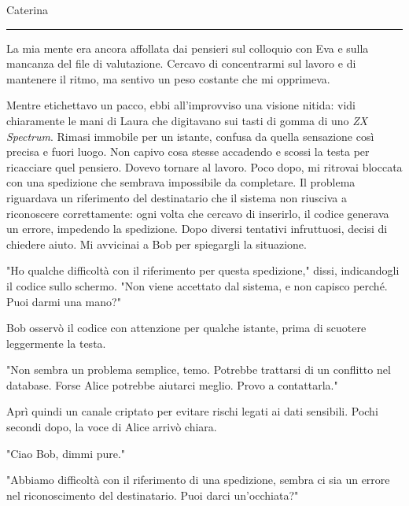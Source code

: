 \vspace{1em}
\begin{center}Caterina\end{center}
\hrule
\vspace{1em}

La mia mente era ancora affollata dai pensieri sul colloquio con Eva e sulla mancanza del file di valutazione. Cercavo di concentrarmi sul lavoro e di mantenere il ritmo, ma sentivo un peso costante che mi opprimeva.

Mentre etichettavo un pacco, ebbi all'improvviso una visione nitida: vidi chiaramente le mani di Laura che digitavano sui tasti di gomma di uno \emph{ZX Spectrum}. Rimasi immobile per un istante, confusa da quella sensazione così precisa e fuori luogo. Non capivo cosa stesse accadendo e scossi la testa per ricacciare quel pensiero. Dovevo tornare al lavoro.
Poco dopo, mi ritrovai bloccata con una spedizione che sembrava impossibile da completare. Il problema riguardava un riferimento del destinatario che il sistema non riusciva a riconoscere correttamente: ogni volta che cercavo di inserirlo, il codice generava un errore, impedendo la spedizione. Dopo diversi tentativi infruttuosi, decisi di chiedere aiuto. Mi avvicinai a Bob per spiegargli la situazione.

\begin{dialogue}
 "Ho qualche difficoltà con il riferimento per questa spedizione," dissi, indicandogli il codice sullo schermo. "Non viene accettato dal sistema, e non capisco perché. Puoi darmi una mano?"
\end{dialogue}

Bob osservò il codice con attenzione per qualche istante, prima di scuotere leggermente la testa.

\begin{dialogue}
 "Non sembra un problema semplice, temo. Potrebbe trattarsi di un conflitto nel database. Forse Alice potrebbe aiutarci meglio. Provo a contattarla."
\end{dialogue}

Aprì quindi un canale criptato per evitare rischi legati ai dati sensibili. Pochi secondi dopo, la voce di Alice arrivò chiara.

\begin{dialogue}
 "Ciao Bob, dimmi pure."
\end{dialogue}

\begin{dialogue}
 "Abbiamo difficoltà con il riferimento di una spedizione, sembra ci sia un errore nel riconoscimento del destinatario. Puoi darci un'occhiata?"
\end{dialogue}

